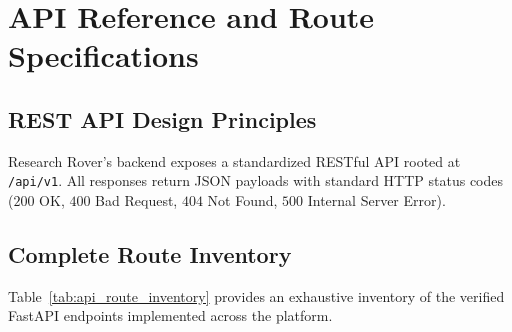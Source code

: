 \section{API Reference and Route Specifications}
\label{sec:api_reference}

\subsection{REST API Design Principles}
Research Rover's backend exposes a standardized RESTful API rooted at \texttt{/api/v1}. All responses return JSON payloads with standard HTTP status codes ($200$ OK, $400$ Bad Request, $404$ Not Found, $500$ Internal Server Error).

\subsection{Complete Route Inventory}
Table~\ref{tab:api_route_inventory} provides an exhaustive inventory of the verified FastAPI endpoints implemented across the platform.

